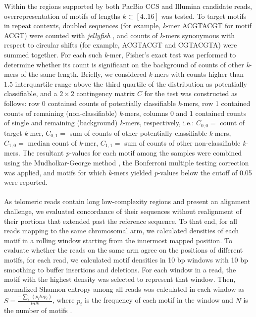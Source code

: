 \documentclass{article}
\begin{document}
Within the regions supported by both PacBio CCS and Illumina candidate reads, overrepresentation of motifs of lengths $k \subset [4 .. 16]$ was tested.
To target motifs in repeat contexts, doubled sequences (for example, \textit{k}-mer ACGTACGT for motif ACGT) were counted with \textit{jellyfish} \cite{jellyfish}, and counts of \textit{k}-mers synonymous with respect to circular shifts (for example, ACGTACGT and CGTACGTA) were summed together.
For each such \textit{k}-mer, Fisher's exact test was performed to determine whether its count is significant on the background of counts of other \textit{k}-mers of the same length.
Briefly, we considered \textit{k}-mers with counts higher than 1.5 interquartile range above the third quartile of the distribution as potentially classifiable, and a $2\times{}2$ contingency matrix $ C $ for the test was constructed as follows:
row 0 contained counts of potentially classifiable \textit{k}-mers,
row 1 contained counts of remaining (non-classifiable) \textit{k}-mers,
columns 0 and 1 contained counts of single and remaining (background) \textit{k}-mers, respectively,
i.e.:
$ C_{0,0} = $ {\rmfamily count of target \textit{k}-mer},
$ C_{0,1} = $ {\rmfamily sum of counts of other potentially classifiable \textit{k}-mers},
$ C_{1,0} = $ {\rmfamily median count of \textit{k}-mer},
$ C_{1,1} = $ {\rmfamily sum of counts of other non-classifiable \textit{k}-mers}.
The resultant \textit{p}-values for each motif among the samples were combined using the Mudholkar-George method \cite{george}, the Bonferroni multiple testing correction was applied, and motifs for which \textit{k}-mers yielded \textit{p}-values below the cutoff of 0.05 were reported.
\\~\\
As telomeric reads contain long low-complexity regions and present an alignment challenge, we evaluated concordance of their sequences without realignment of their portions that extended past the reference sequence.
To that end, for all reads mapping to the same chromosomal arm, we calculated densities of each motif in a rolling window starting from the innermost mapped position.
To evaluate whether the reads on the same arm agree on the positions of different motifs, for each read, we calculated motif densities in 10 bp windows with 10 bp smoothing to buffer insertions and deletions.
For each window in a read, the motif with the highest density was selected to represent that window.
Then, normalized Shannon entropy among all reads was calculated in each window as $ S = \frac{ - \sum_{i} \; ( p_{i} ln p_{i} )}{ln N} $, where $ p_{i} $ is the frequency of each motif in the window and $ N $ is the number of motifs \cite{hepc_entropy}.
\end{document}
